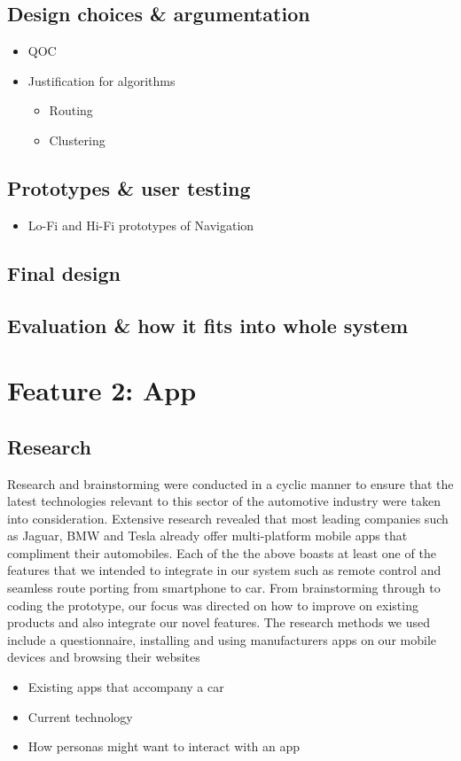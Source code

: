 \documentclass{article}
\begin{document}
\subsection{Design choices \& argumentation}
  \begin{itemize}
    \item QOC
    \item Justification for algorithms
      \begin{itemize}
        \item Routing
        \item Clustering
      \end{itemize}
  \end{itemize}
\subsection{Prototypes \& user testing}
\begin{itemize}
	\item Lo-Fi and Hi-Fi prototypes of Navigation
\end{itemize}
\subsection{Final design}
\subsection{Evaluation \& how it fits into whole system}

\section{Feature 2: App}
\subsection{Research}
Research and brainstorming were conducted in a cyclic manner to ensure that the latest technologies relevant to this sector of the automotive industry were taken into consideration. Extensive research revealed that most leading companies such as Jaguar, BMW and Tesla already offer multi-platform mobile apps that compliment their automobiles. Each of the the above boasts at least one of the features that we intended to integrate in our system such as remote control and seamless route porting from smartphone to car. From brainstorming through to coding the prototype, our focus was directed on how to improve on existing products and also integrate our novel features. 
The research methods we used include a questionnaire, installing and using manufacturers apps on our mobile devices and browsing their websites
	\begin{itemize}
		\item Existing apps that accompany a car
        \item Current technology
		\item How personas might want to interact with an app
	\end{itemize}
\end{document}
